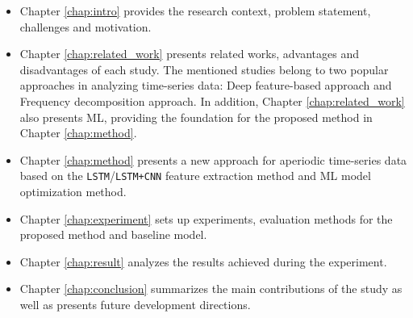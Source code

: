 \begin{itemize}
    \item Chapter \ref{chap:intro} provides the research context, problem statement, challenges and motivation.
    \item Chapter \ref{chap:related_work} presents related works, advantages and disadvantages of each study. The mentioned studies belong to two popular approaches in analyzing time-series data: Deep feature-based approach and Frequency decomposition approach. In addition, Chapter \ref{chap:related_work} also presents ML, providing the foundation for the proposed method in Chapter \ref{chap:method}.
    \item Chapter \ref{chap:method} presents a new approach for aperiodic time-series data based on the \verb|LSTM|/\verb|LSTM+CNN| feature extraction method and ML model optimization method.
    \item Chapter \ref{chap:experiment} sets up experiments, evaluation methods for the proposed method and baseline model.
    \item Chapter \ref{chap:result} analyzes the results achieved during the experiment.
    \item Chapter \ref{chap:conclusion} summarizes the main contributions of the study as well as presents future development directions.
\end{itemize}

